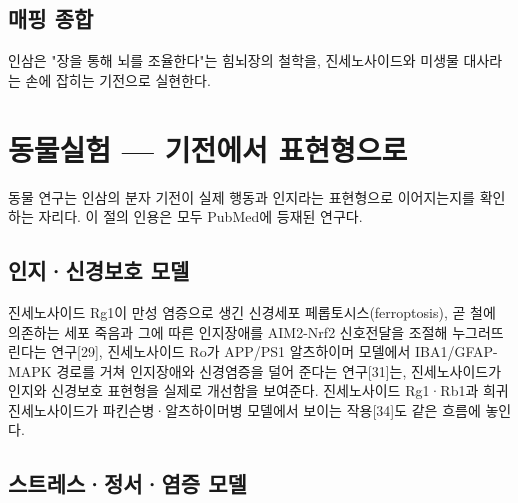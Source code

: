 \documentclass[12pt,oneside]{book}
\begin{document}
\subsection{매핑 종합}

\vspace{2pt}\vspace{3pt}

인삼은 "장을 통해 뇌를 조율한다"는 힘뇌장의 철학을, 진세노사이드와 미생물 대사라는 손에 잡히는 기전으로 실현한다.

\section{동물실험 — 기전에서 표현형으로}

동물 연구는 인삼의 분자 기전이 실제 행동과 인지라는 표현형으로 이어지는지를 확인하는 자리다. 이 절의 인용은 모두 PubMed에 등재된 연구다.

\subsection{인지·신경보호 모델}

진세노사이드 Rg1이 만성 염증으로 생긴 신경세포 페롭토시스(ferroptosis), 곧 철에 의존하는 세포 죽음과 그에 따른 인지장애를 AIM2-Nrf2 신호전달을 조절해 누그러뜨린다는 연구[29], 진세노사이드 Ro가 APP/PS1 알츠하이머 모델에서 IBA1/GFAP-MAPK 경로를 거쳐 인지장애와 신경염증을 덜어 준다는 연구[31]는, 진세노사이드가 인지와 신경보호 표현형을 실제로 개선함을 보여준다. 진세노사이드 Rg1·Rb1과 희귀 진세노사이드가 파킨슨병·알츠하이머병 모델에서 보이는 작용[34]도 같은 흐름에 놓인다.

\subsection{스트레스·정서·염증 모델}
\end{document}
